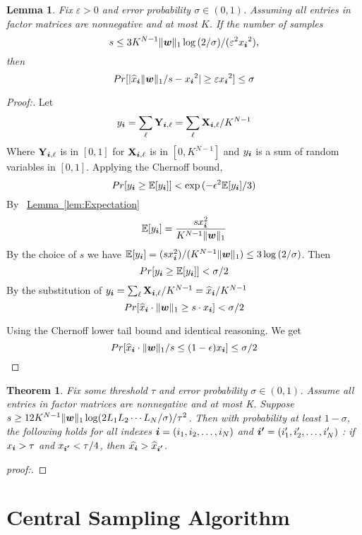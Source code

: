 \documentclass[letterpaper]{article}
\newcommand{\V}[1]{{\bm{{\MakeLowercase{#1}}}}}
\newcommand{\M}[1]{{\bm{\mathbf{\MakeUppercase{#1}}}}}
\newcommand{\norm}[2]{\|#1\|_{#2}}
\newcommand{\Lem}[1] {\hyperref[lem:#1] {Lemma~\ref*{lem:#1}}} %
\newtheorem{lemma}{Lemma}
\newtheorem{theorem}{Theorem}
\begin{document}
\begin{lemma}\label{lem:Bound}
Fix $\varepsilon > 0$ and error probability $\sigma \in (0,1)$. Assuming all entries in factor matrices are nonnegative and at most $K$. If the number of samples
\[
s \leq 3K^{N-1}\norm{\V{W}}{1}\log{(2/\sigma)}/(\varepsilon ^2{x_{\V{i}}}^2),
\]
then
\[
Pr[|{\widehat{x}_{\V{i}}}\norm{\V{W}}{1}/s-{x_{\V{i}}}^2| \geq \varepsilon{x_{\V{i}}}^2] \leq \sigma
\]
\end{lemma}

\begin{proof}[Proof:]
Let
\[
    y_{\V{i}} = \sum_{\ell}\M{Y}_{\V{i},\ell} = \sum_{\ell}\M{X}_{\V{i},\ell}/K^{N-1}
\]
Where $\M{Y}_{\V{i},\ell}$ is in $[0,1]$ for $\M{X}_{\V{i},\ell}$ is in $[0,K^{N-1}]$ and $y_{\V{i}}$ is a sum of random variables in $[0,1]$.
Applying the Chernoff bound,
\[
Pr[y_{\V{i}} \geq \mathbb{E}[y_{\V{i}}]] < \exp{(-\epsilon^2\mathbb{E}[y_{\V{i}}]/3)}
\]
By ~\Lem{Expectation}
\[
\mathbb{E}[y_{\V{i}}] = \frac{sx^2_{\V{i}}}{K^{N-1}\norm{\V{W}}{1}}
\]
By the choice of $s$ we have $\mathbb{E}[y_{\V{i}}]=(sx^2_{\V{i}})/(K^{N-1}\norm{\V{W}}{1}) \leq 3\log{(2/\sigma)}$. Then
\[
Pr[y_{\V{i}} \geq \mathbb{E}[y_{\V{i}}]] < \sigma/2
\]
By the substitution of $y_{\V{i}}=\sum_{\ell}\M{X}_{\V{i},\ell}/K^{N-1}=\widehat{x}_{\V{i}}/K^{N-1}$
\[
Pr[\widehat{x}_{\V{i}}\cdot\norm{\V{W}}{1} \geq s\cdot x_{\V{i}}] < \sigma/2
\]

Using the Chernoff lower tail bound and identical reasoning. We get
\[
Pr[\widehat{x}_{\V{i}}\cdot\norm{\V{W}}{1}/s \leq (1-\epsilon)x_{\V{i}}] \leq \sigma/2
\]
\end{proof}

\begin{theorem}\label{theo:Order}
Fix some threshold $\tau$ and error probability $\sigma\in(0,1)$. Assume all entries in factor matrices are nonnegative and at most  K. Suppose $s \geq 12K^{N-1}\norm{\V{W}}{1}\log(2L_1L_2\cdots L_N/\sigma)/{\tau^2}$. Then with probability at least $1-\sigma$, the following holds for all indexes $\V{i} = (i_1,i_2,\ldots,i_N)$ and $\V{i'} = (i'_1,i'_2,\ldots,i'_N)$ : if $x_{\V{i}}>\tau$ and $ x_{\V{i'}} < \tau/4$, then $\widehat{x_{\V{i}}}>\widehat{x}_{\V{i'}}$.
\end{theorem}

\begin{proof}[proof:]

\end{proof}


\section{Central Sampling Algorithm}
\end{document}
